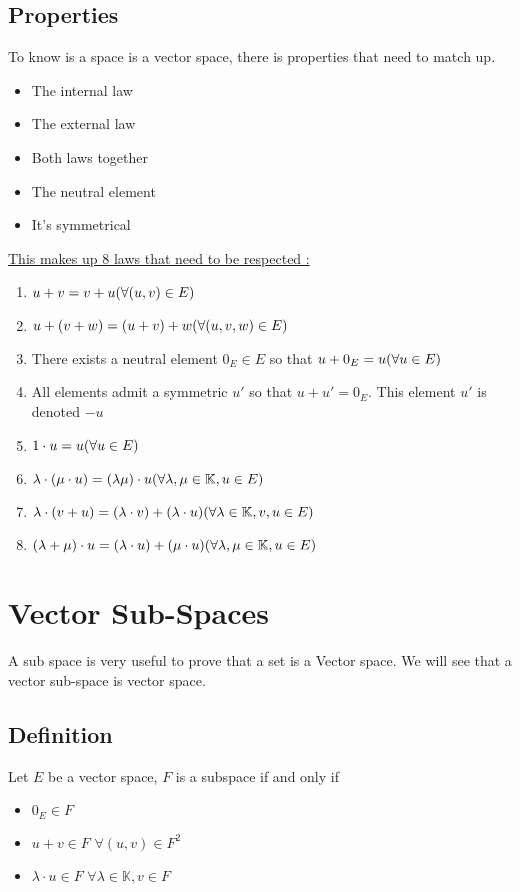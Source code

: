\documentclass[notitlepage]{math}
\begin{document}
\subsection{Properties}
To know is a space is a vector space, there is properties that need to match up.\\
\begin{itemize}
    \item The internal law
    \item The external law
    \item Both laws together
    \item The neutral element
    \item It's symmetrical
\end{itemize}
\underline{This makes up 8 laws that need to be respected :}
\begin{enumerate}
    \item $u + v = v + u \space\space\space(\forall (u,v) \in E)$
    \item $u + (v + w) = (u + v) + w \space\space\space(\forall (u,v,w) \in E)$  
    \item There exists a neutral element $0_E \in E$ so that $u + 0_E = u \space\space\space(\forall u \in E)$
    \item  All elements admit a symmetric $u'$ so that $u + u' = 0_E$. This element $u'$  is denoted $-u$ 
    \item $1 \cdot u  = u \space\space\space(\forall u\in E)$
    \item $\lambda \cdot (\mu \cdot u) = (\lambda \mu) \cdot u \space\space\space(\forall \space\lambda,\mu \in \mathbb{K} ,u \in E)$
    \item $\lambda \cdot (v + u) = (\lambda \cdot v)  + (\lambda \cdot u) \space\space\space(\forall \space\lambda \in \mathbb{K} ,v,u \in E)$
    \item $(\lambda + \mu) \cdot u = (\lambda \cdot u)  + (\mu \cdot u) \space\space\space(\forall \space\lambda,\mu \in \mathbb{K} ,u \in E)$
\end{enumerate}

\section{Vector Sub-Spaces}
A sub space is very useful to prove that a set is a Vector space. We will see that a vector sub-space is vector space.
\subsection{Definition}
Let $E$ be a vector space,  $F$ is a subspace if and only if
\begin{itemize}
    \item $0_E \in F$
    \item $u + v \in F$ $ \forall (u,v) \in F^2$
    \item $\lambda \cdot u \in F$ $ \forall \lambda \in \mathbb{K},v \in F$
\end{itemize}
\end{document}

